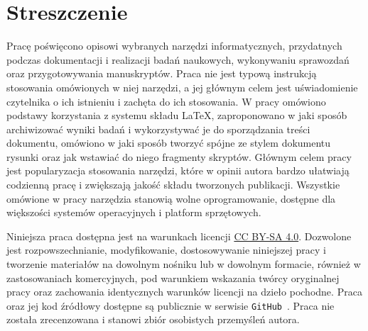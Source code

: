 \chapter*{Streszczenie}

Pracę poświęcono opisowi wybranych narzędzi informatycznych, przydatnych podczas dokumentacji i realizacji badań naukowych, wykonywaniu sprawozdań oraz przygotowywania manuskryptów. Praca nie jest typową instrukcją stosowania omówionych w niej narzędzi, a jej głównym celem jest uświadomienie czytelnika o ich istnieniu i zachęta do ich stosowania. W pracy omówiono podstawy korzystania z systemu składu \LaTeX{}, zaproponowano w jaki sposób archiwizować wyniki badań i wykorzystywać je do sporządzania treści dokumentu, omówiono w jaki sposób tworzyć spójne ze stylem dokumentu rysunki oraz jak wstawiać do niego fragmenty skryptów. Głównym celem pracy jest popularyzacja stosowania narzędzi, które w opinii autora bardzo ułatwiają codzienną pracę i zwiększają jakość składu tworzonych publikacji. Wszystkie omówione w pracy narzędzia stanowią wolne oprogramowanie, dostępne dla większości systemów operacyjnych i platform sprzętowych.

Niniejsza praca dostępna jest na warunkach licencji \href{https://creativecommons.org/licenses/by-sa/4.0}{CC BY-SA 4.0}. Dozwolone jest rozpowszechnianie, modyfikowanie, dostosowywanie niniejszej pracy i tworzenie materiałów na dowolnym nośniku lub w dowolnym formacie, również w zastosowaniach komercyjnych, pod warunkiem wskazania twórcy oryginalnej pracy oraz zachowania identycznych warunków licencji na dzieło pochodne. Praca oraz jej kod źródłowy dostępne są publicznie w serwisie \texttt{GitHub}~\cite{auth_this}. Praca nie została zrecenzowana i stanowi zbiór osobistych przemyśleń autora.

